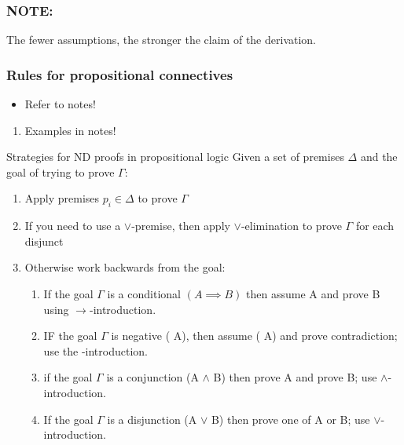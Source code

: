 \documentclass[11pt]{article}
\begin{document}
\subsubsection{NOTE:}
\label{sec:org8f2b56e}
The fewer assumptions, the stronger the claim of the derivation.
\subsubsection{Rules for propositional connectives}
\label{sec:org6db2ecf}

\begin{itemize}
\item Refer to notes!
\end{itemize}
\begin{enumerate}
\item Examples in notes!
\label{sec:orge89eb98}
\end{enumerate}
\item Strategies for ND proofs in propositional logic
\label{sec:org8843109}
Given a set of premises \(\Delta\) and the goal of trying to prove \(\Gamma\):
\begin{enumerate}
\item Apply premises \(p_i \in \Delta\) to prove \(\Gamma\)
\item If you need to use a \(\lor\)-premise, then apply \(\lor\)-elimination to prove \(\Gamma\) for each disjunct
\item Otherwise work backwards from the goal:
\begin{enumerate}
\item If the goal \(\Gamma\) is a conditional \((A \implies B)\) then assume A and prove B using \(\rightarrow\)-introduction.
\item IF the goal \(\Gamma\) is negative (\textlnot{} A), then assume (\textlnot{} \textlnot{} A) and prove contradiction; use the \textlnot{}-introduction.
\item if the goal \(\Gamma\) is a conjunction (A \(\land\) B) then prove A and prove B; use \(\land\)-introduction.
\item If the goal \(\Gamma\) is a disjunction (A \(\lor\) B) then prove one of A or B; use \(\lor\)-introduction.
\end{enumerate}
\end{enumerate}
\end{document}
